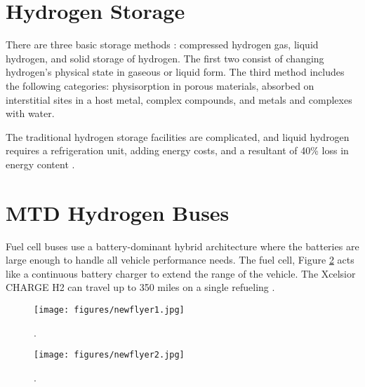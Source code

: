 \documentclass[11pt,letterpaper]{article}
\begin{document}
\section{Hydrogen Storage}
There are three basic storage methods \cite{carriveau_hydrogen_2016}:
compressed hydrogen gas, liquid hydrogen, and solid storage of hydrogen. 
The first two consist of changing hydrogen's physical state in gaseous or liquid form.
The third method includes the following categories: physisorption in porous materials, absorbed on interstitial sites in a host metal, complex compounds, and metals and complexes with water.

The traditional hydrogen storage facilities are complicated, and liquid hydrogen requires a refrigeration unit, adding energy costs, and a resultant of 40\% loss in energy content \cite{carriveau_hydrogen_2016}.

\section{MTD Hydrogen Buses}

Fuel cell buses use a battery-dominant hybrid architecture where the batteries are large enough to handle all vehicle performance needs.
The fuel cell, Figure \ref{fig:nf2} acts like a continuous battery charger to extend the range of the vehicle.
The Xcelsior CHARGE H2 can travel up to 350 miles on a single refueling \cite{new_flyer_xcelsior_2019}.

\begin{figure}[] %
	\centering
	\texttt{[image: figures/newflyer1.jpg]}
	\hfill
	\caption{ \cite{new_flyer_xcelsior_2019}.}
	\label{fig:nf1}
\end{figure}

\begin{figure}[] %
	\centering
	\texttt{[image: figures/newflyer2.jpg]}
	\hfill
	\caption{ \cite{new_flyer_xcelsior_2019}.}
	\label{fig:nf2}
\end{figure}

\pagebreak


\end{document}
